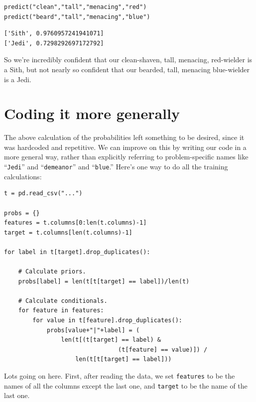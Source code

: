 \begin{Verbatim}[fontsize=\small,samepage=true,frame=single,framesep=3mm]
predict("clean","tall","menacing","red")
predict("beard","tall","menacing","blue")
\end{Verbatim}
\vspace{-.2in}

\begin{Verbatim}[fontsize=\small,samepage=true,frame=leftline,framesep=5mm,framerule=1mm]
['Sith', 0.9760957241941071]
['Jedi', 0.7298292697172792]
\end{Verbatim}

So we're incredibly confident that our clean-shaven, tall, menacing,
red-wielder is a Sith, but not nearly so confident that our bearded, tall,
menacing blue-wielder is a Jedi.

\vspace{.2in}
\section{Coding it more generally}
\label{codingNbGenerally}

The above calculation of the probabilities left something to be desired, since
it was hardcoded and repetitive. We can improve on this by writing our code in
a more general way, rather than explicitly referring to problem-specific names
like ``\texttt{Jedi}'' and ``\texttt{demeanor}'' and ``\texttt{blue}.'' Here's
one way to do all the training calculations:


\begin{Verbatim}[fontsize=\small,samepage=true,frame=single,framesep=3mm]
t = pd.read_csv("...")

probs = {}
features = t.columns[0:len(t.columns)-1]
target = t.columns[len(t.columns)-1]

for label in t[target].drop_duplicates():

    # Calculate priors.
    probs[label] = len(t[t[target] == label])/len(t)

    # Calculate conditionals.
    for feature in features:
        for value in t[feature].drop_duplicates():
            probs[value+"|"+label] = (
                len(t[(t[target] == label) &
                                (t[feature] == value)]) / 
                    len(t[t[target] == label]))
\end{Verbatim}

Lots going on here. First, after reading the data, we set \texttt{features} to
be the names of all the columns except the last one, and \texttt{target} to be
the name of the last one.

